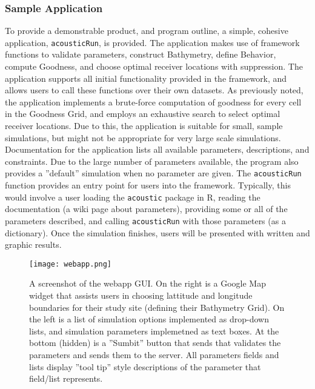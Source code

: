 \subsubsection{Sample Application}
To provide a demonstrable product, and program outline, a simple, cohesive application, \texttt{acousticRun}, is provided.  The application makes use of framework functions to validate parameters, construct Bathymetry, define Behavior, compute Goodness, and choose optimal receiver locations with suppression.  The application supports all initial functionality provided in the framework, and allows users to call these functions over their own datasets.  As previously noted, the application implements a brute-force computation of goodness for every cell in the Goodness Grid, and employs an exhaustive search to select optimal receiver locations.  Due to this, the application is suitable for small, sample simulations, but might not be appropriate for very large scale simulations.  Documentation \cite{acousticdeployWiki} for the application lists all available parameters, descriptions, and constraints.  Due to the large number of parameters available, the program also provides a ''default'' simulation when no parameter are given.  The \texttt{acousticRun} function provides an entry point for users into the framework.  Typically, this would involve a user loading the \texttt{acoustic} package in R, reading the documentation (a wiki page about parameters), providing some or all of the parameters described, and calling \texttt{acousticRun} with those parameters (as a dictionary).  Once the simulation finishes, users will be presented with written and graphic results. 

\begin{figure}[ht]
	\centering
	\texttt{[image: webapp.png]}
	\caption{A screenshot of the webapp GUI.  On the right is a Google Map widget that assists users in choosing lattitude and longitude boundaries for their study site (defining their Bathymetry Grid).  On the left is a list of simulation options implemented as drop-down lists, and simulation parameters implemetned as text boxes.  At the bottom (hidden) is a ''Sumbit'' button that sends that validates the parameters and sends them to the server.  All parameters fields and lists display ''tool tip'' style descriptions of the parameter that field/list represents.
		\label{webApp}}
\end{figure}

